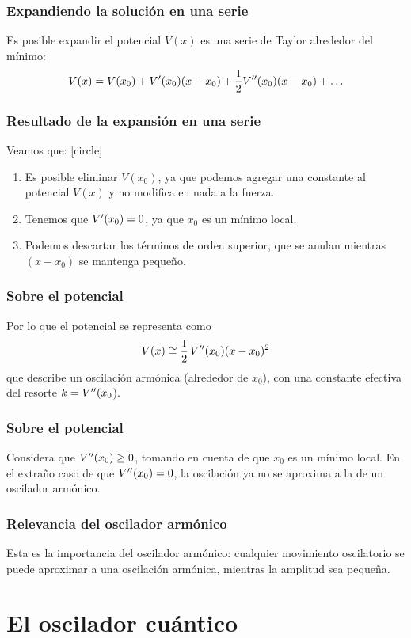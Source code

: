 \documentclass[12pt]{beamer}
\begin{document}
\begin{frame}
\frametitle{Expandiendo la solución en una serie}
Es posible expandir el potencial $V(x)$ es una serie de Taylor alrededor del mínimo:
\begin{align*}
    V(x) = V(x_{0}) + {V}^{\prime} (x_{0}) (x - x_{0}) + \dfrac{1}{2} {V}^{\prime \prime} (x_{0}) (x - x_{0}) + \ldots
\end{align*}
\end{frame}
\begin{frame}
\frametitle{Resultado de la expansión en una serie}
Veamos que:
[circle]
\begin{enumerate}[<+->]
\item Es posible eliminar $V(x_{0})$, ya que podemos agregar una constante al potencial $V(x)$ y no modifica en nada a la fuerza.
\item Tenemos que ${V}^{\prime}(x_{0}) = 0$, ya que $x_{0}$ es un mínimo local.
\item Podemos descartar los términos de orden superior, que se anulan mientras $(x - x_{0})$ se mantenga pequeño.
\end{enumerate}
\end{frame}
\begin{frame}
\frametitle{Sobre el potencial}
Por lo que el potencial se representa como
\begin{align*}
    V(x) \cong \dfrac{1}{2} \, {V}^{\prime \prime} (x_{0}) (x - x_{0})^{2}
\end{align*}
que describe un oscilación armónica (alrededor de $x_{0}$), con una constante efectiva del resorte $k = {V}^{\prime \prime} (x_{0}$).
\end{frame}
\begin{frame}
\frametitle{Sobre el potencial}
Considera que ${V}^{\prime \prime}(x_{0})\geq 0$, tomando en cuenta de que $x_{0}$ es un mínimo local. En el extraño caso de que ${V}^{\prime \prime} (x_{0})= 0$, la oscilación ya no se aproxima a la de un oscilador armónico.
\end{frame}
\begin{frame}
\frametitle{Relevancia del oscilador armónico}
Esta es la importancia del oscilador armónico: cualquier movimiento oscilatorio se puede aproximar a una oscilación armónica, mientras la amplitud sea pequeña.
\end{frame}

\section{El oscilador cuántico}
\end{document}
